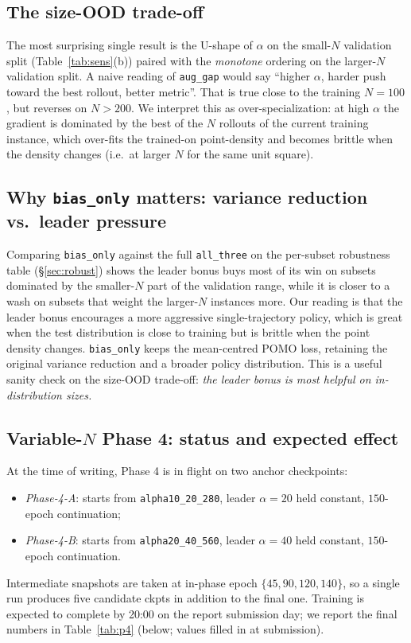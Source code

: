 \documentclass[11pt,a4paper]{article}
\begin{document}
\subsection{The size-OOD trade-off}

The most surprising single result is the U-shape of $\alpha$ on the
small-$N$ validation split (Table~\ref{tab:sens}(b)) paired with the
\emph{monotone} ordering on the larger-$N$ validation split. A naive
reading of \texttt{aug\_gap} would say ``higher $\alpha$, harder push
toward the best rollout, better metric''. That is true close to the
training $N\!=\!100$, but reverses on $N>200$. We interpret this as
over-specialization: at high $\alpha$ the gradient is dominated by the
best of the $N$ rollouts of the current training instance, which over-fits
the trained-on point-density and becomes brittle when the density changes
(i.e.\ at larger $N$ for the same unit square).

\subsection{Why \texttt{bias\_only} matters: variance reduction vs.\ leader pressure}

Comparing \texttt{bias\_only} against the full \texttt{all\_three} on the
per-subset robustness table (\S\ref{sec:robust}) shows the leader bonus
buys most of its win on subsets dominated by the smaller-$N$ part of the
validation range, while it is closer to a wash on subsets that weight
the larger-$N$ instances more. Our reading is that the leader bonus
encourages a more aggressive single-trajectory policy, which is great when
the test distribution is close to training but is brittle when the point
density changes. \texttt{bias\_only} keeps the mean-centred POMO loss,
retaining the original variance reduction and a broader policy
distribution. This is a useful sanity check on the size-OOD trade-off:
\emph{the leader bonus is most helpful on in-distribution sizes.}

\subsection{Variable-$N$ Phase 4: status and expected effect}

At the time of writing, Phase 4 is in flight on two anchor checkpoints:
%
\begin{itemize}
  \item \textit{Phase-4-A}: starts from \texttt{alpha10\_20\_280}, leader
        $\alpha=20$ held constant, $150$-epoch continuation;
  \item \textit{Phase-4-B}: starts from \texttt{alpha20\_40\_560}, leader
        $\alpha=40$ held constant, $150$-epoch continuation.
\end{itemize}
%
Intermediate snapshots are taken at in-phase epoch $\{45, 90, 120, 140\}$,
so a single run produces five candidate ckpts in addition to the final
one. Training is expected to complete by 20:00 on the report submission
day; we report the final numbers in Table~\ref{tab:p4} (below; values
filled in at submission).
\end{document}
